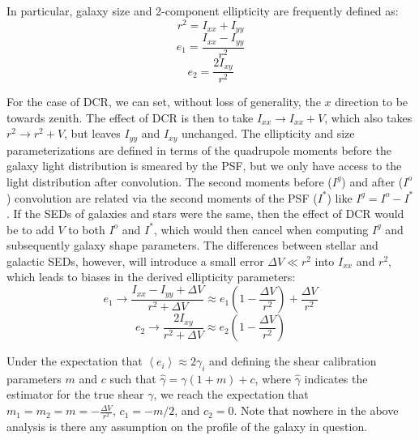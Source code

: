 \documentclass[apj]{emulateapj}
\begin{document}
In particular, galaxy size and 2-component ellipticity are frequently defined as:
\begin{equation}
  r^2 = I_{xx} + I_{yy}
\end{equation}
\begin{equation}
  e_1 = \frac{I_{xx} - I_{yy}}{r^2}
\end{equation}
\begin{equation}
  e_2 = \frac{2 I_{xy}}{r^2}
\end{equation}

For the case of DCR, we can set, without loss of generality, the $x$
direction to be towards zenith.  The effect of DCR is then to take
$I_{xx} \rightarrow I_{xx} + V$, which also takes $r^2 \rightarrow r^2
+ V$, but leaves $I_{yy}$ and $I_{xy}$ unchanged.  The ellipticity and
size parameterizations are defined in terms of the quadrupole moments
before the galaxy light distribution is smeared by the PSF, but we
only have access to the light distribution after convolution.  The
second moments before ($I^g$) and after ($I^o$) convolution are
related via the second moments of the PSF ($I^*$) like $I^g = I^o -
I^*$.  If the SEDs of galaxies and stars were the same, then the
effect of DCR would be to add $V$ to both $I^o$ and $I^*$, which would
then cancel when computing $I^g$ and subsequently galaxy shape
parameters.  The differences between stellar and galactic SEDs,
however, will introduce a small error $\Delta V \ll r^2$ into $I_{xx}$
and $r^2$, which leads to biases in the derived ellipticity
parameters:
\begin{equation}
  e_1 \rightarrow \frac{I_{xx} - I_{yy} + \Delta V}{r^2 + \Delta V} \approx e_1 \left(1 - \frac{\Delta V}{r^2}\right) + \frac{\Delta V}{r^2}
\end{equation}
\begin{equation}
  e_2 \rightarrow \frac{2 I_{xy}}{r^2 + \Delta V} \approx e_2 \left(1 - \frac{\Delta V}{r^2}\right)
\end{equation}

Under the expectation that $\left<e_i\right> \approx 2\gamma_i$ and
defining the shear calibration parameters $m$ and $c$ such that
$\hat{\gamma} = \gamma (1 + m) + c$, where $\hat{\gamma}$ indicates
the estimator for the true shear $\gamma$, we reach the expectation
that $m_1 = m_2 = m = -\frac{\Delta V}{r^2}$, $c_1 = -m/2$, and $c_2 =
0$.  Note that nowhere in the above analysis is there any assumption
on the profile of the galaxy in question.
\end{document}
